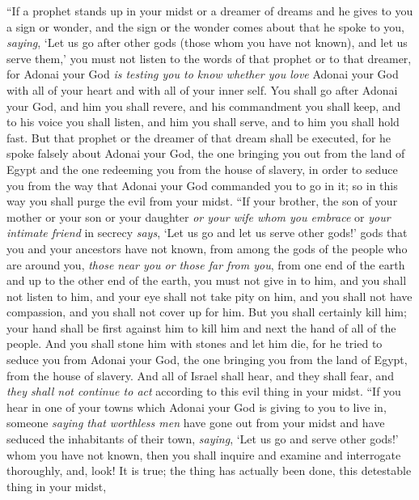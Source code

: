 \begin{biblechapter} %
\verse “If a prophet stands up in your midst or a dreamer of dreams and he gives to you a sign or wonder,
\verse and the sign or the wonder comes about that he spoke to you, \textit{saying}, ‘Let us go after other gods (those whom you have not known), and let us serve them,’
\verse you must not listen to the words of that prophet or to that dreamer, for Adonai your God \textit{is testing you to know whether you love} Adonai your God with all of your heart and with all of your inner self.
\verse You shall go after Adonai your God, and him you shall revere, and his commandment you shall keep, and to his voice you shall listen, and him you shall serve, and to him you shall hold fast.
\verse But that prophet or the dreamer of that dream shall be executed, for he spoke falsely about Adonai your God, the one bringing you out from the land of Egypt and the one redeeming you from the house of slavery, in order to seduce you from the way that Adonai your God commanded you to go in it; so in this way you shall purge the evil from your midst.
\verse “If your brother, the son of your mother or your son or your daughter \textit{or your wife whom you embrace} or \textit{your intimate friend} in secrecy \textit{says}, ‘Let us go and let us serve other gods!’ gods that you and your ancestors have not known,
\verse from among the gods of the people who are around you, \textit{those near you or those far from you}, from one end of the earth and up to the other end of the earth,
\verse you must not give in to him, and you shall not listen to him, and your eye shall not take pity on him, and you shall not have compassion, and you shall not cover up for him.
\verse But you shall certainly kill him; your hand shall be first against him to kill him and next the hand of all of the people.
\verse And you shall stone him with stones and let him die, for he tried to seduce you from Adonai your God, the one bringing you from the land of Egypt, from the house of slavery.
\verse And all of Israel shall hear, and they shall fear, and \textit{they shall not continue to act} according to this evil thing in your midst.
\verse “If you hear in one of your towns which Adonai your God is giving to you to live in, someone \textit{saying that}
\verse \textit{worthless men} have gone out from your midst and have seduced the inhabitants of their town, \textit{saying}, ‘Let us go and serve other gods!’ whom you have not known,
\verse then you shall inquire and examine and interrogate thoroughly, and, look! It is true; the thing has actually been done, this detestable thing in your midst,

\end{biblechapter}
